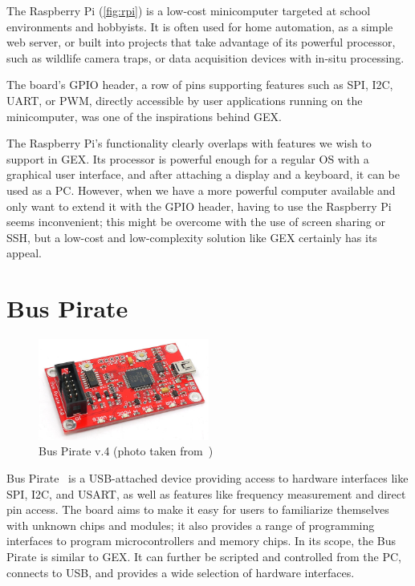The Raspberry Pi (\cref{fig:rpi}) is a low-cost minicomputer targeted at school environments and hobbyists. It is often used for home automation, as a simple web server, or built into projects that take advantage of its powerful processor, such as wildlife camera traps, or data acquisition devices with in-situ processing.

The board's \gls{GPIO} header, a row of pins supporting features such as \gls{SPI}, \gls{I2C}, \gls{UART}, or \gls{PWM}, directly accessible by user applications running on the minicomputer, was one of the inspirations behind GEX.

The Raspberry Pi's functionality clearly overlaps with features we wish to support in GEX. Its processor is powerful enough for a regular \gls{OS} with a graphical user interface, and after attaching a display and a keyboard, it can be used as a \gls{PC}. However, when we have a more powerful computer available and only want to extend it with the \gls{GPIO} header, having to use the Raspberry Pi seems inconvenient; this might be overcome with the use of screen sharing or \gls{SSH}, but a low-cost and low-complexity solution like GEX certainly has its appeal.

\section{Bus Pirate}

\begin{figure}[H]
	\centering
	\includegraphics[width=0.5\textwidth] {img/buspirate.jpg}
	\caption{\label{fig:buspirate}Bus Pirate v.4 (photo taken from~\cite{buspirate-product-page})}
\end{figure}


Bus Pirate~\cite{buspirate} is a USB-attached device providing access to hardware interfaces like \gls{SPI}, \gls{I2C}, and \gls{USART}, as well as features like frequency measurement and direct pin access. The board aims to make it easy for users to familiarize themselves with unknown chips and modules; it also provides a range of programming interfaces to program microcontrollers and memory chips. In its scope, the Bus Pirate is similar to GEX. It can further be scripted and controlled from the PC, connects to \gls{USB}, and provides a wide selection of hardware interfaces.

